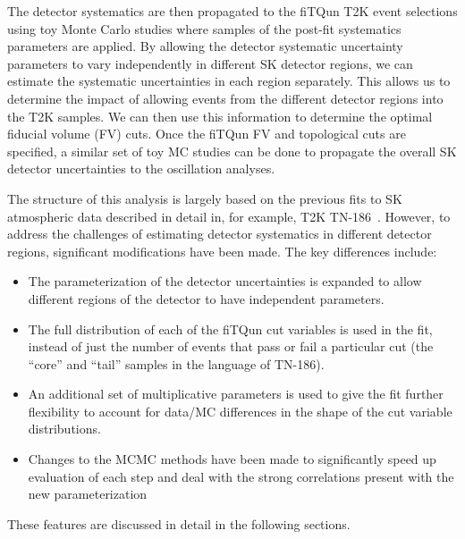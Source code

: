 The detector systematics are then propagated to the fiTQun T2K event selections
using toy Monte Carlo studies where samples of the post-fit systematics
parameters are applied.  By allowing the detector systematic uncertainty
parameters to vary independently in different SK detector regions, we can
estimate the systematic uncertainties in each region separately.  This allows
us to determine the impact of allowing events from the different detector
regions into the T2K samples.  We can then use this information to determine
the optimal fiducial volume (FV) cuts.  Once the fiTQun FV and topological cuts are
specified, a similar set of toy MC studies can be done to propagate the overall
SK detector uncertainties to the oscillation analyses.

The structure of this analysis is largely based on the previous fits to SK
atmospheric data described in detail in, for example, T2K TN-186~\cite{tn186}.
However, to address the challenges of estimating detector systematics in
different detector regions, significant modifications have been made. The key
differences include:
%
\begin{itemize}
  \item The parameterization of the detector uncertainties is expanded to allow
    different regions of the detector to have independent 
    parameters.
  \item The full distribution of each of the fiTQun cut variables is used in
    the fit, instead of just the number of events that pass or fail a particular
    cut (the ``core'' and ``tail'' samples in the language of TN-186).  
  \item An additional set of multiplicative parameters is used to give the fit
    further flexibility to account for data/MC differences in the shape of the
    cut variable distributions.
  \item Changes to the MCMC methods have been made to significantly speed up
    evaluation of each step and deal with the strong correlations present with
    the new parameterization
\end{itemize}
%
These features are discussed in detail in the following sections.



